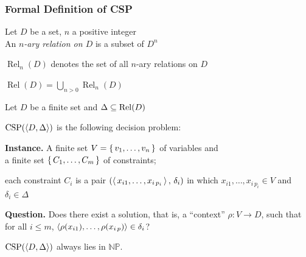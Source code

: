 \documentclass[12pt,xcolor=dvipsnames%
   ]{beamer}
\DeclareMathOperator{\Rel}{Rel}
\DeclareMathOperator{\CSP}{CSP}
\newcommand{\FF}{\mathbb{F}}
\renewcommand{\.}{\cdot}
\newcommand{\NP}{\ensuremath{\mathbb{NP}}\xspace}
\begin{document}
\begin{frame}
  \frametitle{Formal Definition of CSP}

  Let $D$ be a set, $n$ a positive integer\\
  An \emph{$n$-ary relation on $D$} is a subset of $D^n$

  \pause
  $\Rel_n(D)$ denotes the set of all $n$-ary relations on $D$

  $\Rel(D) = \bigcup\limits_{n>0} \Rel_n(D)$
\end{frame}

\begin{frame}
  Let $D$ be a finite set and $\Delta\sseq \Rel(D)$

  $\CSP(\<D,\Delta\>)$ is the following decision problem:

  \textbf{Instance.} A finite set $V=\left\{\,v_1,\dots,v_n\,\right\}$ of
    \alert{variables}
    and\\
    a finite set $\left\{\,C_1,\dots,C_m\,\right\}$ of \alert{constraints};

    each constraint $C_i$ is a pair $(\left\langle\,x_{i1},\dots,x_{i\,p_i}\,\right\rangle,\,
    \delta_i)$ in which $x_{i1},\dots,x_{i\,p_i} \in V$ and $\delta_i\in
    \Delta$

    \pause
    \textbf{Question.} Does there exist a \alert{solution}, that is,
    a ``context''  $\rho \colon V\to D$, such
    that for all $i\leq m$, $\langle\rho(x_{i1}),\dots,\rho(x_{i\,p})\rangle\in \delta_i$?

    \pause
    $\CSP(\<D,\Delta\>)$ always lies in \NP.

\end{frame}

\end{document}

